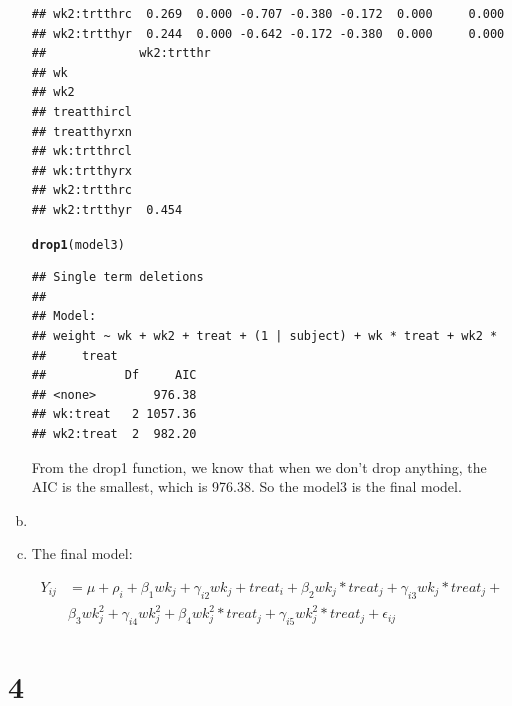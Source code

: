 \documentclass{article}\usepackage[]{graphicx}\usepackage[]{color}
\makeatletter
\newcommand{\hlstd}[1]{\textcolor[rgb]{0.345,0.345,0.345}{#1}}%
\newcommand{\hlkwd}[1]{\textcolor[rgb]{0.737,0.353,0.396}{\textbf{#1}}}%
\newenvironment{kframe}{%
 \def\at@end@of@kframe{}%
 \ifinner\ifhmode%
  \def\at@end@of@kframe{\end{minipage}}%
  \begin{minipage}{\columnwidth}%
 \fi\fi%
 \def\FrameCommand##1{\hskip\@totalleftmargin \hskip-\fboxsep
 \colorbox{shadecolor}{##1}\hskip-\fboxsep
     \hskip-\linewidth \hskip-\@totalleftmargin \hskip\columnwidth}%
 \MakeFramed {\advance\hsize-\width
   \@totalleftmargin\z@ \linewidth\hsize
   \@setminipage}}%
 {\par\unskip\endMakeFramed%
 \at@end@of@kframe}
\newenvironment{knitrout}{}{} %
\makeatother
\begin{document}
\begin{enumerate}[(a)]
\begin{knitrout}
\begin{kframe}
\begin{verbatim}
## wk2:trtthrc  0.269  0.000 -0.707 -0.380 -0.172  0.000     0.000   
## wk2:trtthyr  0.244  0.000 -0.642 -0.172 -0.380  0.000     0.000   
##             wk2:trtthr
## wk                    
## wk2                   
## treatthircl           
## treatthyrxn           
## wk:trtthrcl           
## wk:trtthyrx           
## wk2:trtthrc           
## wk2:trtthyr  0.454
\end{verbatim}
\begin{alltt}
  \hlkwd{drop1}\hlstd{(model3)}
\end{alltt}
\begin{verbatim}
## Single term deletions
## 
## Model:
## weight ~ wk + wk2 + treat + (1 | subject) + wk * treat + wk2 * 
##     treat
##           Df     AIC
## <none>        976.38
## wk:treat   2 1057.36
## wk2:treat  2  982.20
\end{verbatim}
\end{kframe}
\end{knitrout}

\qquad From the drop1 function, we know that when we don't drop anything, the AIC is the smallest, which is 976.38. So the model3 is the final model.

\item



\item

The final model:

\begin{displaymath}
\begin{split}
  Y_{ij} &= \mu + \rho_i + \beta_1wk_j + \gamma_{i2}wk_j + treat_i + \beta_2wk_j *treat_j + \gamma_{i3}wk_j*treat_j +\\
         & \beta_3wk^2_j + \gamma_{i4}wk^2_j + \beta_4wk^2_j*treat_j + \gamma_{i5}wk^2_j*treat_j + \epsilon_{ij}  
\end{split}
\end{displaymath}

\end{enumerate}

\section{4}
\end{document}
